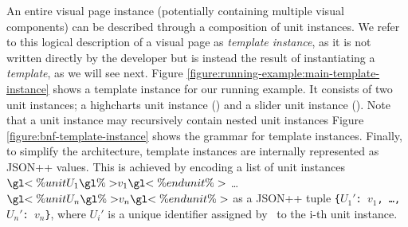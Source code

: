 An entire visual page instance (potentially containing multiple visual components) can be described through a composition of unit instances. We refer to this logical description of a visual page as \emph{template instance}, as it is not written directly by the developer but is instead the result of instantiating a \emph{template}, as we will see next. Figure \ref{figure:running-example:main-template-instance} shows a template instance for our running example. It consists of two unit instances; a highcharts unit instance () and a slider unit instance (). Note that a unit instance may recursively contain nested unit instances    
Figure \ref{figure:bnf-template-instance} shows the grammar for template instances. Finally, to simplify the architecture, template instances are internally represented as JSON++ values. This is achieved by encoding a list of unit instances $\gl{<\% unit } U_1 \gl{ \%> } v_1 \gl{ <\% end unit \%>}$ \ldots $\gl{<\% unit } U_n \gl{ \%> } v_n \gl{ <\% end unit \%>}$ as a JSON++ tuple \texttt{\{$U_1'$: $v_1$, \ldots, $U_n'$: $v_n$\}}, where $U_i'$ is a unique identifier assigned by \projname\ to the i-th unit instance. 

 


